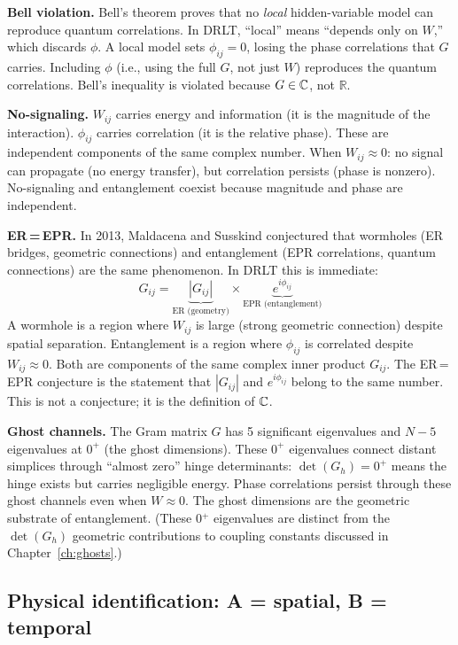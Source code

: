 \textbf{Bell violation.} Bell's theorem proves that no \emph{local} hidden-variable model can reproduce quantum correlations. In DRLT, ``local'' means ``depends only on $W$,'' which discards $\phi$. A local model sets $\phi_{ij} = 0$, losing the phase correlations that $G$ carries. Including $\phi$ (i.e., using the full $G$, not just $W$) reproduces the quantum correlations. Bell's inequality is violated because $G \in \mathbb{C}$, not $\mathbb{R}$.

\textbf{No-signaling.} $W_{ij}$ carries energy and information (it is the magnitude of the interaction). $\phi_{ij}$ carries correlation (it is the relative phase). These are independent components of the same complex number. When $W_{ij} \approx 0$: no signal can propagate (no energy transfer), but correlation persists (phase is nonzero). No-signaling and entanglement coexist because magnitude and phase are independent.

\textbf{ER\,=\,EPR.} In 2013, Maldacena and Susskind conjectured that wormholes (ER bridges, geometric connections) and entanglement (EPR correlations, quantum connections) are the same phenomenon. In DRLT this is immediate:
\begin{equation}
G_{ij} = \underbrace{|G_{ij}|}_{\text{ER (geometry)}} \times \underbrace{e^{i\phi_{ij}}}_{\text{EPR (entanglement)}}
\end{equation}
A wormhole is a region where $W_{ij}$ is large (strong geometric connection) despite spatial separation. Entanglement is a region where $\phi_{ij}$ is correlated despite $W_{ij} \approx 0$. Both are components of the same complex inner product $G_{ij}$. The ER\,=\,EPR conjecture is the statement that $|G_{ij}|$ and $e^{i\phi_{ij}}$ belong to the same number. This is not a conjecture; it is the definition of $\mathbb{C}$.

\textbf{Ghost channels.} The Gram matrix $G$ has 5 significant eigenvalues and $N - 5$ eigenvalues at $0^+$ (the ghost dimensions). These $0^+$ eigenvalues connect distant simplices through ``almost zero'' hinge determinants: $\det(G_h) = 0^+$ means the hinge exists but carries negligible energy. Phase correlations persist through these ghost channels even when $W \approx 0$. The ghost dimensions are the geometric substrate of entanglement. (These 0$^+$ eigenvalues are distinct from the $\det(G_h)$ geometric contributions to coupling constants discussed in Chapter~\ref{ch:ghosts}.)

\subsection{Physical identification: A = spatial, B = temporal}
\label{sec:causal_split}

